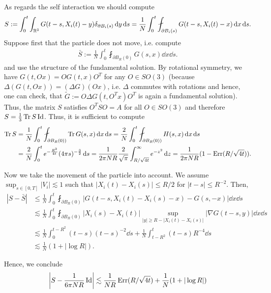 \documentclass[abstracton, paper=a4, fontsize=11pt,DIV=12,bibliography=totoc]{scrartcl}
\begin{document}
As regards the self interaction we should compute 
\begin{align*}
    S := \int_0^t\int_{\R^3}G(t-s,X_i(t)-y) \delta_{\partial B_i(s)} \dd y\dd s = \frac 1N\int_0^t\fint_{ \partial B_i(s)}G(t-s,X_i(t)-x)\dd x\dd s.
\end{align*}
 Suppose first that the particle does not move, i.e. compute
 \begin{align*}
    \bar S :=\frac 1N\int_0^t\fint_{ \partial B_R(0)}G(s,x)\dd x\dd s.
\end{align*}
 and use the structure of the fundamental solution. 
By rotational symmetry, we have $G(t,Ox) = O G(t,x) O^T$ for any $O \in SO(3)$ (because $\Delta (G(t,Ox)) = (\Delta G)(Ox)$, i.e. $\Delta$ commutes with rotations and hence, one can check, that $\tilde{G}:=O \Delta G(t,O^T x) O^T$  is again a fundamental solution). Thus, the matrix $S$ satisfies $O^T S O = A$ for all $O \in SO(3)$ and therefore $S = \frac 1 3 \operatorname{Tr} S \operatorname{Id} $. 
Thus, it is sufficient to compute 
    \begin{align*}
    \Tr S& =\frac 1N\int_0^t\fint_{\partial B_R(0))} \Tr G(s,x)\dd x\dd s = \frac 2 { N} \int_0^t\fint_{\partial B_R(0))}   H(s,x)\dd x\dd s \\
    &= \frac 2 { N} \int_0^t e^{-\frac{R^2}{4t}} (4 \pi s)^{-\frac 3 2} \dd s = \frac {1}{2 \pi N R} \frac{2}{\sqrt \pi} \int_{R/\sqrt{4 t}}^\infty  e^{- z^2}  \dd z = \frac {1}{2 \pi N R} (1 - \Err(R/\sqrt{4 t})) .
\end{align*}

Now we take the movement of the particle into account. 
We assume $\sup_{s \in [0,T]} |V_i| \lesssim 1$ such that $|X_i(t) -X_i(s)| \leq R/2$ for $|t - s| \leq R^{-2}$. 
Then, 
\begin{align*}
    |S - \bar S| &\leq \frac 1N\int_0^t\fint_{ \partial B_R(0)} |G(t-s, X_i(t) -X_i(s) -x) -G(s,-x )| \dd x\dd s \\
    & \lesssim  \frac 1N\int_0^t\fint_{ \partial B_R(0)} |X_i(s) - X_i(t)| \sup_{|y| \geq  R - | X_i(t) -X_i(s)|} | \nabla G(t-s, y)|  \dd x\dd s \\
    & \lesssim \frac 1N \int_0^{t-R^2} (t-s) (t-s)^{-2}  \dd s + \frac 1N \int_{t-R^2}^t (t-s) R^{-4}  \dd s \\
    & \lesssim \frac 1 N (1 + |\log R|). 
\end{align*}

Hence, we conclude
\begin{align*}
    \left|S - \frac 1 {6 \pi N R} \operatorname{Id}\right| \lesssim  \frac {1}{NR} \operatorname{Err}(R/\sqrt{4 t}) + \frac 1 N (1 + |\log R|)
\end{align*}
\end{document}
